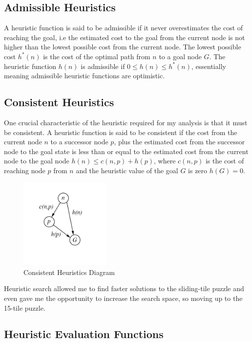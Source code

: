 \documentclass[progress]{cmpreport}
\begin{document}
\subsection{Admissible Heuristics}
A heuristic function is said to be admissible if it never overestimates the cost of reaching the goal, i.e the estimated cost to the goal from the current node is not higher than the lowest possible cost from the current node. The lowest possible cost $h^*(n)$ is the cost of the optimal path from $n$ to a goal node $G$. The heuristic function $h(n)$ is admissible if $0 \leq h(n) \leq h^*(n)$, essentially meaning admissible heuristic functions are optimistic.

\subsection{Consistent Heuristics}
One crucial characteristic of the heuristic required for my analysis is that it must be consistent. A heuristic function is said to be consistent if the cost from the current node $n$ to a successor node $p$, plus the estimated cost from the successor node to the goal state is less than or equal to the estimated cost from the current node to the goal node $h(n)\leq c(n,p) + h(p)$, where $c(n,p)$ is the cost of reaching node $p$ from $n$ and the heuristic value of the goal $G$ is zero $h(G)=0$. 


\begin{figure}[ht]
	\centering
	\includegraphics[width=0.4\textwidth]{consistent}
	\captionsetup{justification=centering}
	\caption{Consistent Heuristics Diagram}
\end{figure}



 

Heuristic search allowed me to find faster solutions to the sliding-tile puzzle and even gave me the opportunity to increase the search space, so moving up to the 15-tile puzzle.

\subsection{Heuristic Evaluation Functions}
\end{document}
